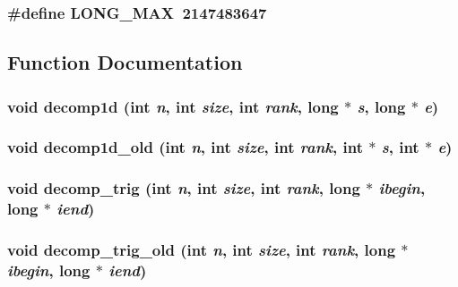 \subsubsection{\setlength{\rightskip}{0pt plus 5cm}\#define LONG\_\-MAX~2147483647}\label{md__para_8c_50fece4db74f09568b2938db583c5655}




\subsection{Function Documentation}
\subsubsection{\setlength{\rightskip}{0pt plus 5cm}void decomp1d (int {\em n}, int {\em size}, int {\em rank}, long $\ast$ {\em s}, long $\ast$ {\em e})}\label{md__para_8c_7aa756cd6784fa84fa81049a9fc0e39e}


\subsubsection{\setlength{\rightskip}{0pt plus 5cm}void decomp1d\_\-old (int {\em n}, int {\em size}, int {\em rank}, int $\ast$ {\em s}, int $\ast$ {\em e})}\label{md__para_8c_7593e025b560b939d6c2525e43c6cd88}


\subsubsection{\setlength{\rightskip}{0pt plus 5cm}void decomp\_\-trig (int {\em n}, int {\em size}, int {\em rank}, long $\ast$ {\em ibegin}, long $\ast$ {\em iend})}\label{md__para_8c_06f6289ed0f4d7f4f66d78ae6ef4365d}


\subsubsection{\setlength{\rightskip}{0pt plus 5cm}void decomp\_\-trig\_\-old (int {\em n}, int {\em size}, int {\em rank}, long $\ast$ {\em ibegin}, long $\ast$ {\em iend})}\label{md__para_8c_80e866770bf04cf71cac42ae9b9c8d59}


